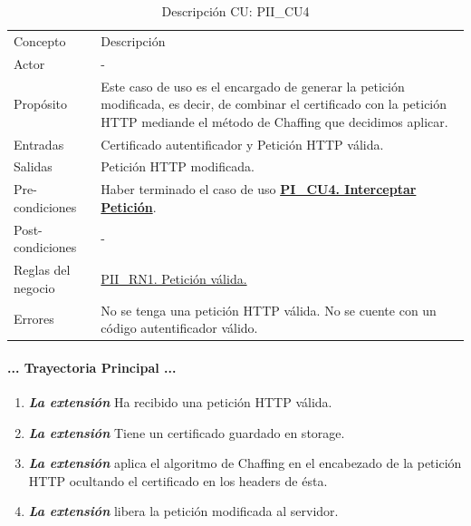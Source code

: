 \documentclass[12pt, a4paper, titlepage]{report}
\begin{document}
				\newpage
			    \begin{table}[H]
    				\begin{tabular}{ |p{3.5cm}||p{9.5cm}|}
    					\hline
    					\rowcolor{guindapoli}  					\multicolumn{2}{|c|}{\textbf{\textcolor{white}{Caso de uso: PII\_CU4. Generación de Chaffing}}}\\
    					\hline
    					\rowcolor{azulfuerte}Concepto & Descripción\\
    					\hline
    					\cellcolor{azulclaro}Actor & 
    					-\\ 
    					\hline
    					\cellcolor{azulclaro}Propósito &
    					Este caso de uso es el encargado de generar la petición modificada, es decir, de combinar el certificado con la petición HTTP mediande el método de Chaffing que decidimos aplicar.\\
    					\hline
    					\cellcolor{azulclaro}Entradas &
    					Certificado autentificador y Petición HTTP válida.\\
    					\hline
    					\cellcolor{azulclaro}Salidas &
    					Petición HTTP modificada.\\
    					\hline
    					\cellcolor{azulclaro}Pre-condiciones&
    					Haber terminado el caso de uso \textbf{\hyperref[PI_CU4]{PI\_CU4. Interceptar Petición}}. \\
    					\hline
    					\cellcolor{azulclaro}Post-condiciones&
    					-\\
    					\hline
    					\cellcolor{azulclaro}Reglas del negocio&
    					\hyperref[PII_RN1]{PII\_RN1. Petición válida.}\\
    					\hline
    					\cellcolor{azulclaro}Errores &
    				    No se tenga una petición HTTP válida. No se cuente con un c\'odigo autentificador válido.\\
    					\hline
    				\end{tabular}
				\caption[DCU: PII\_CU4]{Descripción CU: PII\_CU4}
				\end{table}
				
				\paragraph{... Trayectoria Principal ...}
				\begin{enumerate}
				    \item \textbf{\textit{La extensión}} Ha recibido una petición HTTP válida.
				    \item \textbf{\textit{La extensión}} Tiene un certificado guardado en storage.
				    \item \textbf{\textit{La extensión}} aplica el algoritmo de Chaffing en el encabezado de la petición HTTP ocultando el certificado en los headers de ésta.
				    \item \textbf{\textit{La extensión}} libera la petición modificada al servidor.
				\end{enumerate}
\end{document}
